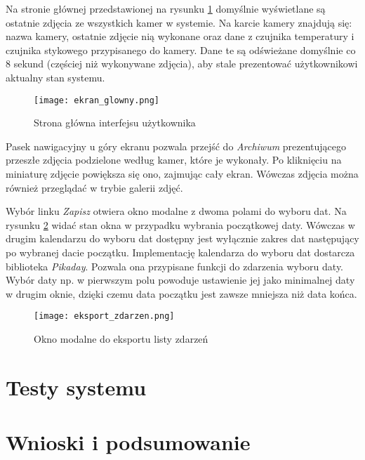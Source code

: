 \documentclass[a4paper,11pt,twoside]{article}
\begin{document}
Na stronie głównej przedstawionej na rysunku \ref{fig: homepage} domyślnie wyświetlane są ostatnie zdjęcia ze wszystkich kamer w systemie. Na karcie kamery znajdują się: nazwa kamery, ostatnie zdjęcie nią wykonane oraz dane z czujnika temperatury i czujnika stykowego przypisanego do kamery. Dane te są odświeżane domyślnie co 8 sekund (częściej niż wykonywane zdjęcia), aby stale prezentować użytkownikowi aktualny stan systemu. 
\begin{figure}[H]
\begin{center}
\texttt{[image: ekran\_glowny.png]}
\caption{Strona główna interfejsu użytkownika}
\label{fig: homepage}
\end{center}
\end{figure}

Pasek nawigacyjny u góry ekranu pozwala przejść do \textit{Archiwum} prezentującego przeszłe zdjęcia podzielone według kamer, które je wykonały. Po kliknięciu na miniaturę zdjęcie powiększa się ono, zajmując cały ekran. Wówczas zdjęcia można również przeglądać w trybie galerii zdjęć.

Wybór linku \textit{Zapisz} otwiera okno modalne z dwoma polami do wyboru dat. Na rysunku \ref{fig: eksport} widać stan okna w przypadku wybrania początkowej daty. Wówczas w drugim kalendarzu do wyboru dat dostępny jest wyłącznie zakres dat następujący po wybranej dacie początku. Implementację kalendarza do wyboru dat dostarcza biblioteka \textit{Pikaday}. Pozwala ona przypisane funkcji do zdarzenia wyboru daty. Wybór daty np. w pierwszym polu powoduje ustawienie jej jako minimalnej daty w drugim oknie, dzięki czemu data początku jest zawsze mniejsza niż data końca.
\begin{figure}[H]
\begin{center}
\texttt{[image: eksport\_zdarzen.png]}
\caption{Okno modalne do eksportu listy zdarzeń}
\label{fig: eksport}
\end{center}
\end{figure}

\newpage
\section{Testy systemu}

\newpage
\section{Wnioski i podsumowanie}

\newpage
\end{document}
